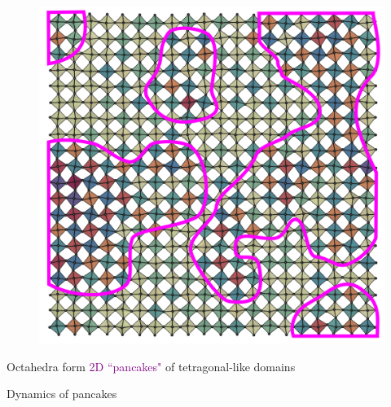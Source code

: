 \documentclass[12pt]{beamer}
\begin{document}

\begin{frame} %

\begin{figure}
    \includegraphics[width=0.65\linewidth]{figs/pancakes.png}
\end{figure}

Octahedra form \textcolor{purple}{2D ``pancakes"} of tetragonal-like domains

\end{frame}


\begin{frame}{Dynamics of pancakes}
\centering
{}
\end{frame}

\end{document}
